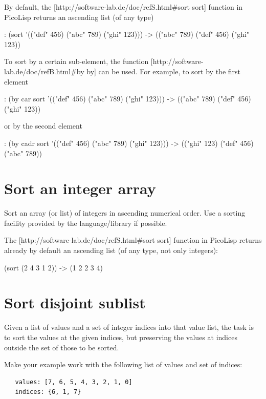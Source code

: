 \begin{wideverbatim}

By default, the [http://software-lab.de/doc/refS.html#sort sort] function in
PicoLisp returns an ascending list (of any type)

: (sort '(("def" 456) ("abc" 789) ("ghi" 123)))
-> (("abc" 789) ("def" 456) ("ghi" 123))

To sort by a certain sub-element, the function
[http://software-lab.de/doc/refB.html#by by] can be used. For example, to
sort by the first element

: (by car sort '(("def" 456) ("abc" 789) ("ghi" 123)))
-> (("abc" 789) ("def" 456) ("ghi" 123))

or by the second element

: (by cadr sort '(("def" 456) ("abc" 789) ("ghi" 123)))
-> (("ghi" 123) ("def" 456) ("abc" 789))

\end{wideverbatim}

\pagebreak{}
\section*{Sort an integer array}

Sort an array (or list) of integers in ascending numerical order. Use a
sorting facility provided by the language/library if possible.

\begin{wideverbatim}

The [http://software-lab.de/doc/refS.html#sort sort] function in
PicoLisp returns already by default an ascending list (of any type,
not only integers):

(sort (2 4 3 1 2))
-> (1 2 2 3 4)

\end{wideverbatim}

\pagebreak{}
\section*{Sort disjoint sublist}

Given a list of values and a set of integer indices into that value
list, the task is to sort the values at the given indices, but
preserving the values at indices outside the set of those to be sorted.

Make your example work with the following list of values and set of
indices: \texttt{ }

\begin{verbatim}
   values: [7, 6, 5, 4, 3, 2, 1, 0]
   indices: {6, 1, 7}
\end{verbatim}

